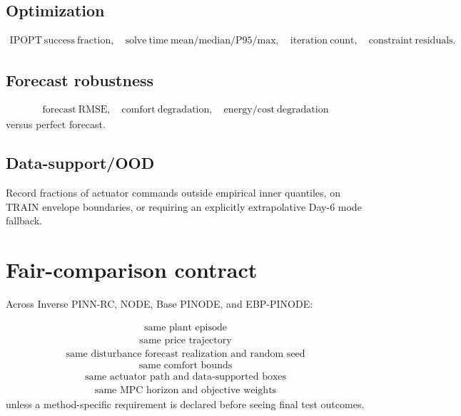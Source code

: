 \documentclass[11pt]{article}
\begin{document}
\subsection*{Optimization}
\begin{align}
\mathrm{IPOPT\ success\ fraction},
\quad
\mathrm{solve\ time\ mean/median/P95/max},
\quad
\mathrm{iteration\ count},
\quad
\mathrm{constraint\ residuals}.
\end{align}

\subsection*{Forecast robustness}
\begin{align}
\mathrm{forecast\ RMSE},
\quad
\mathrm{comfort\ degradation},
\quad
\mathrm{energy/cost\ degradation}
\end{align}
versus perfect forecast.

\subsection*{Data-support/OOD}
Record fractions of actuator commands outside empirical inner quantiles, on TRAIN envelope
boundaries, or requiring an explicitly extrapolative Day-6 mode fallback.

\section{Fair-comparison contract}

Across Inverse PINN-RC, NODE, Base PINODE, and EBP-PINODE:

\begin{align}
\boxed{\text{same plant episode}}
\end{align}
\begin{align}
\boxed{\text{same price trajectory}}
\end{align}
\begin{align}
\boxed{\text{same disturbance forecast realization and random seed}}
\end{align}
\begin{align}
\boxed{\text{same comfort bounds}}
\end{align}
\begin{align}
\boxed{\text{same actuator path and data-supported boxes}}
\end{align}
\begin{align}
\boxed{\text{same MPC horizon and objective weights}}
\end{align}
unless a method-specific requirement is declared before seeing final test outcomes.
\end{document}
